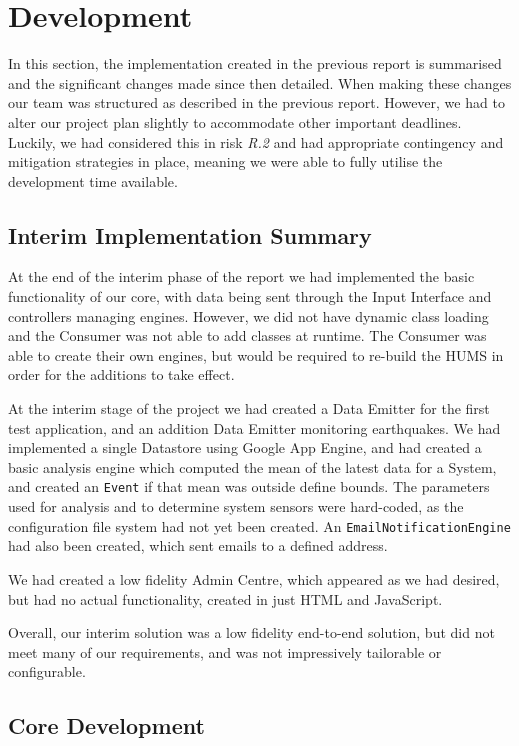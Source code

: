\documentclass[10pt,a4paper]{article}
\begin{document}
\section{Development}
\label{sec:dev}
In this section, the implementation created in the previous report is summarised and the significant changes made since then detailed.
When making these changes our team was structured as described in the previous report. However, we had to alter our project plan slightly to accommodate other important deadlines. Luckily, we had considered this in risk \emph{R.2} and had appropriate  contingency and mitigation strategies in place, meaning we were able to fully utilise the development time available. 

\subsection{Interim Implementation Summary}
\label{sec:interim_summary}
At the end of the interim phase of the report we had implemented the basic functionality of our core, with data being sent through the Input Interface and controllers managing engines. However, we did not have dynamic class loading and the Consumer was not able to add classes at runtime. The Consumer was able to create their own engines, but would be required to re-build the HUMS in order for the additions to take effect.

At the interim stage of the project we had created a Data Emitter for the first test application, and an addition Data Emitter monitoring earthquakes. We had implemented a single Datastore using Google App Engine, and had created a basic analysis engine which computed the mean of the latest data for a System, and created an \texttt{Event} if that mean was outside define bounds. The parameters used for analysis and to determine system sensors were hard-coded, as the configuration file system had not yet been created. An \texttt{EmailNotificationEngine} had also been created, which sent emails to a defined address. 

We had created a low fidelity  Admin Centre, which appeared as we had desired, but had no actual functionality, created in just HTML and JavaScript.

Overall, our interim solution was a low fidelity end-to-end solution, but did not meet many of our requirements, and was not impressively tailorable or configurable. 

\subsection{Core Development}
\label{sec:core}
 
\end{document}
